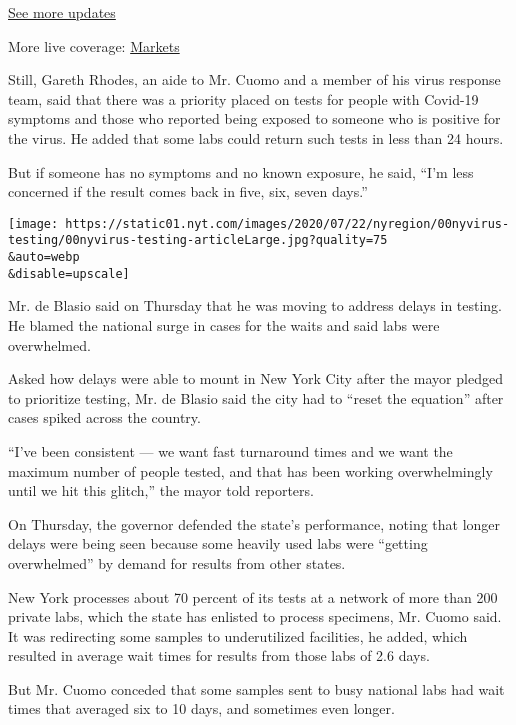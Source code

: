 \href{https://www.nytimes.com/2020/08/04/world/coronavirus-covid-19.html?action=click\&pgtype=Article\&state=default\&region=MAIN_CONTENT_1\&context=storylines_live_updates}{See
more updates}

More live coverage:
\href{https://www.nytimes.com/live/2020/08/03/business/stock-market-today-coronavirus?action=click\&pgtype=Article\&state=default\&region=MAIN_CONTENT_1\&context=storylines_live_updates}{Markets}

Still, Gareth Rhodes, an aide to Mr. Cuomo and a member of his virus
response team, said that there was a priority placed on tests for people
with Covid-19 symptoms and those who reported being exposed to someone
who is positive for the virus. He added that some labs could return such
tests in less than 24 hours.

But if someone has no symptoms and no known exposure, he said, ``I'm
less concerned if the result comes back in five, six, seven days.''

\texttt{[image: https://static01.nyt.com/images/2020/07/22/nyregion/00nyvirus-testing/00nyvirus-testing-articleLarge.jpg?quality=75\\\&auto=webp\\\&disable=upscale]}

Mr. de Blasio said on Thursday that he was moving to address delays in
testing. He blamed the national surge in cases for the waits and said
labs were overwhelmed.

Asked how delays were able to mount in New York City after the mayor
pledged to prioritize testing, Mr. de Blasio said the city had to
``reset the equation'' after cases spiked across the country.

``I've been consistent --- we want fast turnaround times and we want the
maximum number of people tested, and that has been working
overwhelmingly until we hit this glitch,'' the mayor told reporters.

On Thursday, the governor defended the state's performance, noting that
longer delays were being seen because some heavily used labs were
``getting overwhelmed'' by demand for results from other states.

New York processes about 70 percent of its tests at a network of more
than 200 private labs, which the state has enlisted to process
specimens, Mr. Cuomo said. It was redirecting some samples to
underutilized facilities, he added, which resulted in average wait times
for results from those labs of 2.6 days.

But Mr. Cuomo conceded that some samples sent to busy national labs had
wait times that averaged six to 10 days, and sometimes even longer.

